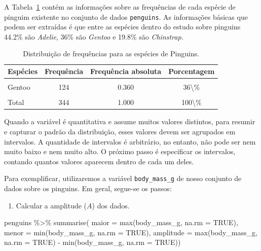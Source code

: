 \documentclass[
  12pt,
  letterpaper,
  DIV=11,
  numbers=noendperiod]{scrreprt}
\newenvironment{Shaded}{\begin{snugshade}}{\end{snugshade}}
\newcommand{\AttributeTok}[1]{\textcolor[rgb]{0.40,0.45,0.13}{#1}}
\newcommand{\ConstantTok}[1]{\textcolor[rgb]{0.56,0.35,0.01}{#1}}
\newcommand{\FunctionTok}[1]{\textcolor[rgb]{0.28,0.35,0.67}{#1}}
\newcommand{\NormalTok}[1]{\textcolor[rgb]{0.00,0.23,0.31}{#1}}
\newcommand{\SpecialCharTok}[1]{\textcolor[rgb]{0.37,0.37,0.37}{#1}}
\providecommand{\tightlist}{%
  \setlength{\itemsep}{0pt}\setlength{\parskip}{0pt}}\usepackage{longtable,booktabs,array}
\theoremstyle{definition}
\theoremstyle{exemplo}
\begin{document}
A Tabela~\ref{tbl-freq-pin} contém as informações sobre as frequências
de cada espécie de pinguim existente no conjunto de dados
\texttt{penguins}. As informações básicas que podem ser extraídas é que
entre as espécies dentro do estudo sobre pinguins 44.2\% são
\emph{Adelie}, 36\% são \emph{Gentoo} e 19.8\% são \emph{Chinstrap}.

\begin{longtable}[t]{lccc}

\caption{\label{tbl-freq-pin}Distribuição de frequências para as
espécies de Pinguins.}

\tabularnewline

\toprule
Espécies & Frequência & Frequência absoluta & Porcentagem\\
\midrule
\cellcolor{gray!10}{Adelie} & \cellcolor{gray!10}{152} & \cellcolor{gray!10}{0.442} & \cellcolor{gray!10}{44.2\textbackslash{}\%}\\
Gentoo & 124 & 0.360 & 36\textbackslash{}\%\\
\cellcolor{gray!10}{Chinstrap} & \cellcolor{gray!10}{68} & \cellcolor{gray!10}{0.198} & \cellcolor{gray!10}{19.8\textbackslash{}\%}\\
\midrule
Total & 344 & 1.000 & 100\textbackslash{}\%\\
\bottomrule

\end{longtable}

Quando a variável é quantitativa e assume muitos valores distintos, para
resumir e capturar o padrão da distribuição, esses valores devem ser
agrupados em intervalos. A quantidade de intervalos é arbitrário, no
entanto, não pode ser nem muito baixo e nem muito alto. O próximo passo
é especificar os intervalos, contando quantos valores aparecem dentro de
cada um deles.

Para exemplificar, utilizaremos a variável \texttt{body\_mass\_g} de
nosso conjunto de dados sobre os pinguins. Em geral, segue-se os passos:

\begin{enumerate}
\def\labelenumi{\arabic{enumi}.}
\tightlist
\item
  Calcular a amplitude (\(A\)) dos dados.
\end{enumerate}

\begin{Shaded}
\begin{Highlighting}[]
\NormalTok{penguins }\SpecialCharTok{\%\textgreater{}\%} 
  \FunctionTok{summarise}\NormalTok{(}
    \AttributeTok{maior =} \FunctionTok{max}\NormalTok{(body\_mass\_g, }\AttributeTok{na.rm =} \ConstantTok{TRUE}\NormalTok{),}
    \AttributeTok{menor =} \FunctionTok{min}\NormalTok{(body\_mass\_g, }\AttributeTok{na.rm =} \ConstantTok{TRUE}\NormalTok{),}
    \AttributeTok{amplitude =} \FunctionTok{max}\NormalTok{(body\_mass\_g, }\AttributeTok{na.rm =} \ConstantTok{TRUE}\NormalTok{) }\SpecialCharTok{{-}} \FunctionTok{min}\NormalTok{(body\_mass\_g, }\AttributeTok{na.rm =} \ConstantTok{TRUE}\NormalTok{))}
\end{Highlighting}
\end{Shaded}
\end{document}
